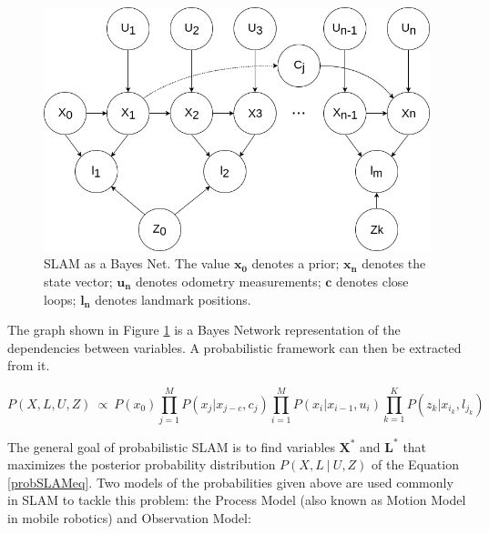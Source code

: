 \documentclass[12pt]{article}
\begin{document}
\begin{figure}
\begin{minipage}{0.65\textwidth}
\centering
\includegraphics[width=\textwidth]{BayesNetSLAM}
\end{minipage} \hfill
\begin{minipage}{0.35\textwidth}
\centering
\caption{SLAM as a Bayes Net. The value $\mathbf{x_0}$ denotes a prior; $\mathbf{x_n}$ denotes the state vector; $\mathbf{u_n}$ denotes odometry measurements; $\mathbf{c}$ denotes close loops; $\mathbf{l_n}$ denotes landmark positions.}
\label{fig:slam1}
\end{minipage}				
\end{figure}
	
The graph shown in Figure \ref{fig:slam1} is a Bayes Network representation of the dependencies between variables. A probabilistic framework can then be extracted from it. 

\begin{equation}
P(X,L,U,Z)\ \propto \ P(x_0)\prod_{j=1}^{M}P(x_j|x_{j-c},c_j)\prod_{i=1}^{M}P(x_i|x_{i-1}, u_i)\prod_{k=1}^{K}P(z_k|x_{i_k},l_{j_k})
\label{probSLAMeq}
\end{equation}

The general goal of probabilistic SLAM is to find variables $\mathbf{X^*}$ and $\mathbf{L^*}$ that maximizes the posterior probability distribution $P(X,L\ |\ U, Z)$ of the Equation \ref{probSLAMeq}. Two models of the probabilities given above are used commonly in SLAM to tackle this problem: the Process Model (also known as Motion Model in mobile robotics) and Observation Model:
	
\end{document}
